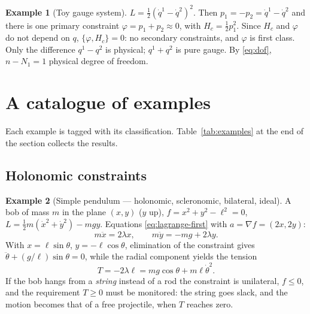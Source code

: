 \documentclass[11pt,a4paper]{article}
\theoremstyle{definition}
\newtheorem{example}{Example}[section]
\theoremstyle{plain}
\theoremstyle{remark}
\newcommand{\Pois}[2]{\{#1,#2\}}
\newcommand{\weq}{\approx}                 %
\begin{document}
\begin{example}[Toy gauge system]\label{ex:toygauge}
$L=\tfrac12(\dot q^1-\dot q^2)^2$. Then $p_1=-p_2=\dot q^1-\dot q^2$ and there is one
primary constraint $\varphi=p_1+p_2\weq0$, with $H_c=\tfrac12p_1^2$. Since $H_c$ and
$\varphi$ do not depend on $q$, $\Pois\varphi{H_c}=0$: no secondary constraints, and $\varphi$
is first class. Only the difference $q^1-q^2$ is physical; $q^1+q^2$ is pure gauge. By
\eqref{eq:dof}, $n-N_1=1$ physical degree of freedom.
\end{example}

\section{A catalogue of examples}\label{sec:examples}
Each example is tagged with its classification. Table~\ref{tab:examples} at the end of the
section collects the results.

\subsection{Holonomic constraints}

\begin{example}[Simple pendulum --- holonomic, scleronomic, bilateral, ideal]\label{ex:pendulum}
A bob of mass $m$ in the plane $(x,y)$ ($y$ up), $f=x^2+y^2-\ell^2=0$, $L=\tfrac12m(\dot x^2+\dot y^2)-mgy$.
Equations \eqref{eq:lagrange-first} with $a=\nabla f=(2x,2y)$:
\[
  m\ddot x=2\lambda x,\qquad m\ddot y=-mg+2\lambda y .
\]
With $x=\ell\sin\theta$, $y=-\ell\cos\theta$, elimination of the constraint gives
$\ddot\theta+(g/\ell)\sin\theta=0$, while the radial component yields the tension
\[
  T=-2\lambda\ell=mg\cos\theta+m\ell\dot\theta^2 .
\]
If the bob hangs from a \emph{string} instead of a rod the constraint is unilateral,
$f\le0$, and the requirement $T\ge0$ must be monitored: the string goes slack, and the motion
becomes that of a free projectile, when $T$ reaches zero.
\end{example}
\end{document}
